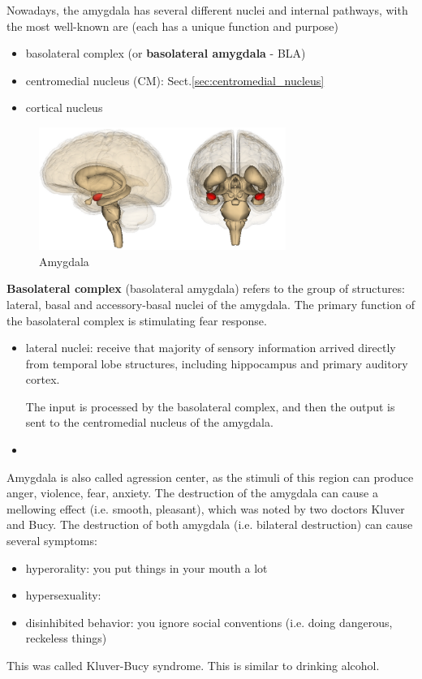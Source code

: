 Nowadays, the amygdala has several different nuclei and internal pathways, with
the most well-known are (each has a unique function and purpose)
\begin{itemize}
  \item basolateral complex (or {\bf basolateral amygdala} - BLA) 
  \item centromedial nucleus (CM): Sect.\ref{sec:centromedial_nucleus} 
  \item cortical nucleus
\end{itemize}

\begin{figure}[hbt]
  \centerline{
  \includegraphics[height=4cm,
    angle=0]{./images/amygdala.eps}}
\caption{Amygdala}
\label{fig:amygdala}
\end{figure}

{\bf Basolateral complex} (basolateral amygdala) refers to the group of
structures: lateral, basal and accessory-basal nuclei of the amygdala.
The primary function of the basolateral complex is stimulating fear response.
\begin{itemize}
  \item lateral nuclei: receive that majority of sensory information arrived
  directly from temporal lobe structures, including hippocampus and
  primary auditory cortex. 

The input is processed by the basolateral complex, and then the output is sent
to the centromedial nucleus of the amygdala.
  
  \item 
\end{itemize}

Amygdala is also called agression center, as the stimuli of this region can 
produce anger, violence, fear, anxiety. The destruction of the 
amygdala can cause a mellowing effect (i.e. smooth, pleasant), which
was noted by two doctors Kluver and Bucy. The
destruction of both amygdala (i.e. bilateral destruction) can cause several
symptoms: 
\begin{itemize}
  \item hyperorality: you put things in your mouth a lot
  \item hypersexuality: 
  \item disinhibited behavior: you ignore social conventions (i.e. doing
  dangerous, reckeless things)
\end{itemize}
This was called Kluver-Bucy syndrome. This is similar to drinking alcohol.
 
